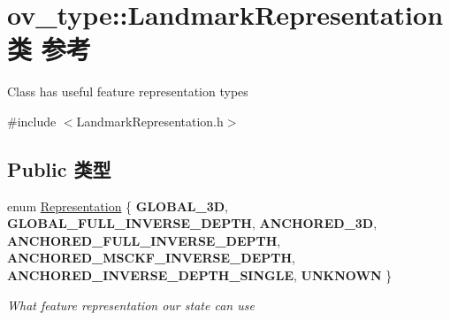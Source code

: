 \hypertarget{classov__type_1_1LandmarkRepresentation}{}\section{ov\+\_\+type\+:\+:Landmark\+Representation类 参考}
\label{classov__type_1_1LandmarkRepresentation}


Class has useful feature representation types  




{\ttfamily \#include $<$Landmark\+Representation.\+h$>$}

\subsection*{Public 类型}
\begin{DoxyCompactItemize}
\item 
\mbox{\label{classov__type_1_1LandmarkRepresentation_a7f5783df6932ace7f098ae243b6d298e}} 
enum \hyperlink{classov__type_1_1LandmarkRepresentation_a7f5783df6932ace7f098ae243b6d298e}{Representation} \{ \newline
{\bfseries G\+L\+O\+B\+A\+L\+\_\+3D}, 
{\bfseries G\+L\+O\+B\+A\+L\+\_\+\+F\+U\+L\+L\+\_\+\+I\+N\+V\+E\+R\+S\+E\+\_\+\+D\+E\+P\+TH}, 
{\bfseries A\+N\+C\+H\+O\+R\+E\+D\+\_\+3D}, 
{\bfseries A\+N\+C\+H\+O\+R\+E\+D\+\_\+\+F\+U\+L\+L\+\_\+\+I\+N\+V\+E\+R\+S\+E\+\_\+\+D\+E\+P\+TH}, 
\newline
{\bfseries A\+N\+C\+H\+O\+R\+E\+D\+\_\+\+M\+S\+C\+K\+F\+\_\+\+I\+N\+V\+E\+R\+S\+E\+\_\+\+D\+E\+P\+TH}, 
{\bfseries A\+N\+C\+H\+O\+R\+E\+D\+\_\+\+I\+N\+V\+E\+R\+S\+E\+\_\+\+D\+E\+P\+T\+H\+\_\+\+S\+I\+N\+G\+LE}, 
{\bfseries U\+N\+K\+N\+O\+WN}
 \}\begin{DoxyCompactList}\small\item\em What feature representation our state can use \end{DoxyCompactList}
\end{DoxyCompactItemize}
